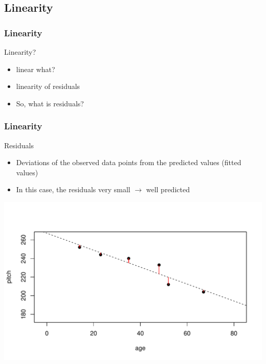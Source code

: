 \documentclass[10p]{beamer}\usepackage[]{graphicx}\usepackage[]{color}
\makeatletter
\def\maxwidth{ %
  \ifdim\Gin@nat@width>\linewidth
    \linewidth
  \else
    \Gin@nat@width
  \fi
}
\newenvironment{knitrout}{}{} %
\makeatother
\begin{document}
\subsection{Linearity}
\begin{frame}
\frametitle{Linearity}
Linearity?
\begin{itemize}
\item linear what?
\pause
\item linearity of residuals
\pause
\item So, what is residuals?
\end{itemize}
\end{frame}

\begin{frame}[fragile]
\frametitle{Linearity}
Residuals
\begin{itemize}
\item Deviations of the observed data points from the predicted values (fitted values)
\item In this case, the residuals very small $\rightarrow$ well predicted
\end{itemize}

\begin{knitrout}
\color{fgcolor}
\includegraphics[width=\maxwidth]{figure/unnamed-chunk-26-1} 

\end{knitrout}
\end{frame}
\end{document}
